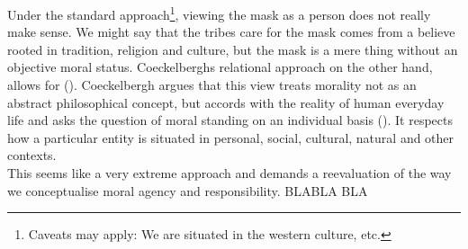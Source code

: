 \documentclass{article}
\begin{document}
Under the standard approach\footnote{Caveats may apply: We are situated in the
western culture, etc.}, viewing the mask as a person does not really make
sense. We might say that the tribes care for the mask comes from a believe
rooted in tradition, religion and culture, but the mask is a mere thing without
an objective moral status. Coeckelberghs relational approach on the other hand,
allows for  (\cite[p.
66]{coeckelbergh2014moral}). Coeckelbergh argues that this view treats morality
not as an abstract philosophical concept, but accords with the reality of human
everyday life and asks the question of moral standing on an individual basis (\cite[p.
66]{coeckelbergh2014moral}). It respects how a particular entity is situated in
personal, social, cultural, natural and other contexts.\\

This seems like a very extreme approach and demands a reevaluation of the way we
conceptualise moral agency and responsibility. BLABLA BLA
\end{document}

